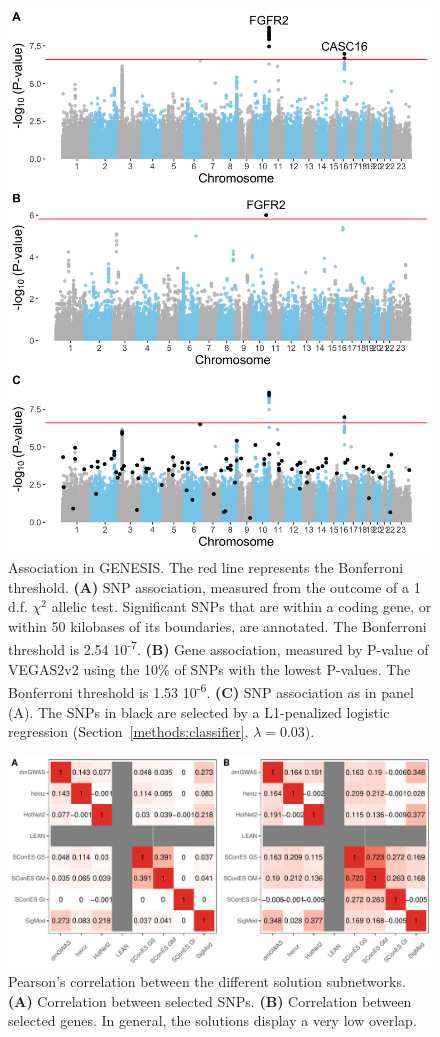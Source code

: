 \documentclass[twocolumn, 11pt]{article}
\begin{document}
\begin{figure}[htbp]
  \centering
  \includegraphics[width=.7\linewidth]{./figures/sfigure_2.png}
  \caption{\label{sfig:snp_gene_manhattan} Association in GENESIS. The red line represents the Bonferroni threshold. \textbf{(A)} SNP association, measured from the outcome of a 1 d.f. $\chi^2$ allelic test. Significant SNPs that are within a coding gene, or within 50 kilobases of its boundaries, are annotated. The Bonferroni threshold is 2.54 \texttimes{} 10\textsuperscript{-7}. \textbf{(B)} Gene association, measured by P-value of VEGAS2v2 \cite{mishra_vegas2:_2015} using the 10\% of SNPs with the lowest P-values. The Bonferroni threshold is 1.53 \texttimes{} 10\textsuperscript{-6}. \textbf{(C)} SNP association as in panel (A). The SNPs in black are selected by a L1-penalized logistic regression (Section~\ref{methods:classifier}, $\lambda = 0.03$).}
\end{figure}

\begin{figure}[htbp]
\centering
\includegraphics[width=.9\linewidth]{./figures/sfigure_3.pdf}
\caption{\label{sfig:pearson_methods}
Pearson's correlation between the different solution subnetworks. \textbf{(A)} Correlation between selected SNPs. \textbf{(B)} Correlation between selected genes. In general, the solutions display a very low overlap.}
\end{figure}
\end{document}
